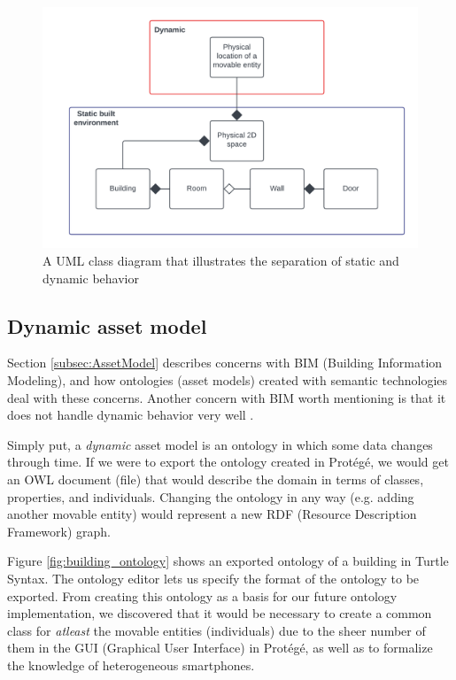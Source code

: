 \documentclass{article}
\begin{document}
\begin{figure}[H]
    \centering
    \includegraphics[scale=0.14]{graphics/static_built_environment.png}
    \caption{A UML class diagram that illustrates the separation of static and dynamic behavior}
    \label{fig:static_built_environment}
\end{figure}


\subsection{Dynamic asset model}\label{subsubsec:DynamicAssetModel}
Section \ref{subsec:AssetModel} describes concerns with BIM (Building Information Modeling), and how ontologies (asset models) created with semantic technologies deal with these concerns. Another concern with BIM worth mentioning is that it does not handle dynamic behavior very well \cite{kamburjan_digital_2022}.

Simply put, a \emph{dynamic} asset model is an ontology in which some data changes through time. If we were to export the ontology created in Protégé, we would get an OWL document (file) that would describe the domain in terms of classes, properties, and individuals. Changing the ontology in any way (e.g. adding another movable entity) would represent a new RDF (Resource Description Framework) graph.

Figure \ref{fig:building_ontology} shows an exported ontology of a building in Turtle Syntax. The ontology editor lets us specify the format of the ontology to be exported. From creating this ontology as a basis for our future ontology implementation, we discovered that it would be necessary to create a common class for \emph{atleast} the movable entities (individuals) due to the sheer number of them in the GUI (Graphical User Interface) in Protégé, as well as to formalize the knowledge of heterogeneous smartphones.
\end{document}
